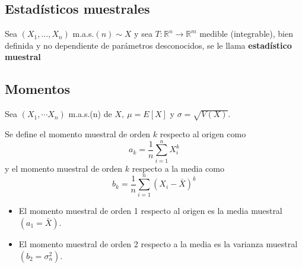 \subsection{Estadísticos muestrales}

\begin{definición}
Sea $\left(X_{1}, \ldots, X_{n}\right)$ m.a.s.$(n) \sim X$ y sea $T: \mathbb{R}^{n} \longrightarrow \mathbb{R}^{m}$ medible (integrable), bien definida y no dependiente de parámetros desconocidos, se le llama \textbf{estadístico muestral}
\end{definición}

\subsection{Momentos}

Sea $\left(X_{1}, \cdots X_{n}\right)$ m.a.s.(n) de $X, \ \mu=E[X]$ y
$\sigma=\sqrt{V(X)}$.
\begin{definición}
Se define el momento muestral de orden $k$ respecto al origen como
\[a_{k}=\frac{1}{n} \sum_{i=1}^{n} X_{i}^{k}\]
y el momento muestral de orden $k$ respecto a la media como
\[b_{k}=\frac{1}{n} \sum_{i=1}^{n}\left(X_{i}-\bar{X}\right)^{k}\]
\end{definición}

\begin{observación}
\vspace{-\topsep} %
\vspace{-\topsep} %
\vspace{-\topsep} %
\begin{itemize}
	\item El momento muestral de orden 1 respecto al origen es la media muestral $(a_1 =
		      \bar{X})$.
	\item El momento muestral de orden 2 respecto a la media es la varianza muestral
	      $(b_2 = \sigma_n^2)$.
\end{itemize}
\end{observación}

